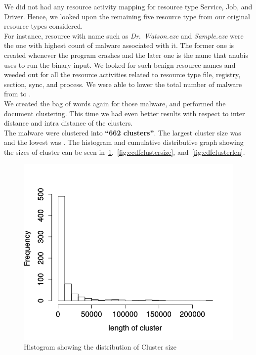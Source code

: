 We did not had any resource activity mapping for resource type Service, Job, and Driver. Hence, we looked upon the remaining five resource type from our original resource types considered.\\
For instance, resource with name such as \emph{Dr.\ Watson.exe} and \emph{Sample.exe} were the one with highest count of malware associated with it. The former one is created whenever the program crashes and the later one is the name that anubis uses to run the binary input.
We looked for such benign resource names and weeded out for all the resource activities related to resource type file, registry, section, sync, and process. We were able to lower the total number of malware from {\gettotalmalwareii{}} to {\gettotalmalwareiii{}}.\\
We created the bag of words again for those {\gettotalmalwareiii{}} malware, and performed the document clustering.
This time we had even better results with respect to inter distance and intra distance of the clusters.\\
The malware were clustered into \textbf{``662 clusters''}.
The largest cluster size was {\getlargestclustersize{}} and the lowest was {\getlowestclustersize{}}.
The histogram and cumulative distributive graph showing the sizes of cluster can be seen in~\ref{fig:histclustersize},~\ref{fig:ecdfclustersize}, and~\ref{fig:cdfclusterlen}.\\
\begin{figure}[htbp]
\begin{center}
  \includegraphics[scale=0.5]{figures/histclustersize.png}
\end{center}
\caption{Histogram showing the distribution of Cluster size}
\label{fig:histclustersize}
\end{figure}
